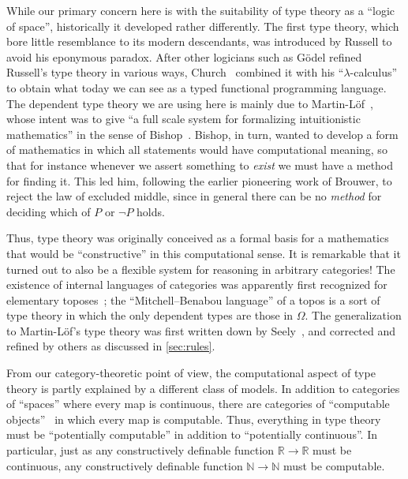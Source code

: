 \documentclass[12pt]{article}
\def\N{\mathbb{N}}
\def\R{\mathbb{R}}
\numberwithin{equation}{section}
\begin{document}
While our primary concern here is with the suitability of type theory as a ``logic of space'', historically it developed rather differently.
The first type theory, which bore little resemblance to its modern descendants, was introduced by Russell to avoid his eponymous paradox.
After other logicians such as G\"odel refined Russell's type theory in various ways, Church~\cite{Church:1940tu,Church:1941tc} combined it with his ``$\lambda$-calculus'' to obtain what today we can see as a typed functional programming language.
The dependent type theory we are using here %
is mainly due to Martin-L\"{o}f~\cite{martinlof:itt-pred,martinlof:itt}, whose intent was to give ``a full scale system for formalizing intuitionistic mathematics'' in the sense of Bishop~\cite{bishop:fca,bb:constr-analysis}.
Bishop, in turn, wanted to develop a form of mathematics in which all statements would have computational meaning, so that for instance whenever we assert something to \emph{exist} we must have a method for finding it.
This led him, following the earlier pioneering work of Brouwer, to reject the law of excluded middle, since in general there can be no \emph{method} for deciding which of $P$ or $\neg P$ holds.

Thus, type theory was originally conceived as a formal basis for a mathematics that would be ``constructive'' in this computational sense.
It is remarkable that it turned out to also be a flexible system for reasoning in arbitrary categories!
The existence of internal languages of categories was apparently first recognized for elementary toposes~\cite{ls:itt-free-topos,mitchell:topoi-sets,bj:logique-des-topos}; the ``Mitchell--Benabou language'' %
of a topos is a sort of type theory in which the only dependent types are those in $\Omega$.
The generalization to Martin-L\"{o}f's type theory was first written down by Seely~\cite{seely:lccc-tt}, and corrected and refined by others as discussed in \cref{sec:rules}.

From our category-theoretic point of view, the computational aspect of type theory is partly explained by a different class of models.
In addition to categories of ``spaces'' where every map is continuous, there are categories of ``computable objects''~\cite{hyland:eff,oosten:realiz} in which every map is computable. %
Thus, everything in type theory
must be ``potentially computable'' in addition to ``potentially continuous''.
In particular, just as any constructively definable function $\R\to\R$ must be continuous, any constructively definable function $\N\to\N$ must be computable.
\end{document}

